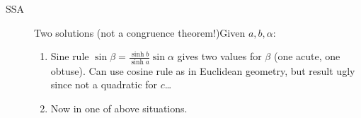 \begin{description}
	\item[SSA] Two solutions (not a congruence theorem!)\lstsp Given $a,b,\alpha$:
	\begin{enumerate}
	  \item Sine rule $\sin\beta=\frac{\sinh b}{\sinh a}\sin\alpha$ gives two values for $\beta$ (one acute, one obtuse). Can use cosine rule as in Euclidean geometry, but result ugly since not a quadratic for $c$\ldots
	  \item Now in one of above situations.
	\end{enumerate}
\end{description}